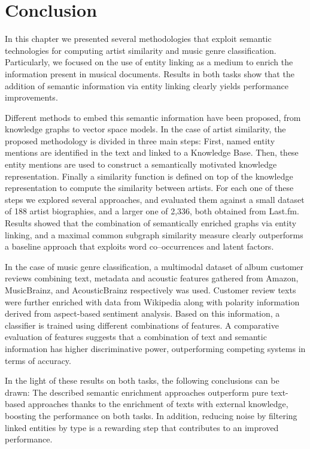 \section{Conclusion}
\label{sec:similarity:conclusion}

In this chapter we presented several methodologies that exploit semantic technologies for computing artist similarity and music genre classification. Particularly, we focused on the use of entity linking as a medium to enrich the information present in musical documents. Results in both tasks show that the addition of semantic information via entity linking clearly yields performance improvements.

Different methods to embed this semantic information have been proposed, from knowledge graphs to vector space models.
In the case of artist similarity, the proposed methodology is divided in three main steps: First, named entity mentions are identified in the text and linked to a Knowledge Base. Then, these entity mentions are used to construct a semantically motivated knowledge representation. Finally a similarity function is defined on top of the knowledge representation to compute the similarity between artists.
For each one of these steps we explored several approaches, and evaluated them against a small dataset of 188 artist biographies, and a larger one of 2,336, both obtained from Last.fm.
Results showed that the combination of semantically enriched graphs via entity linking, and a maximal common subgraph similarity measure clearly outperforms a baseline approach that exploits word co--occurrences and latent factors.

In the case of music genre classification, a multimodal dataset of album customer reviews combining text, metadata and acoustic features gathered from Amazon, MusicBrainz, and AcousticBrainz respectively was used. Customer review texts were further enriched with data from Wikipedia along with polarity information derived from aspect-based sentiment analysis. Based on this information, a classifier is trained using different combinations of features. 
A comparative evaluation of features suggests that a combination of text and semantic information has higher discriminative power, outperforming competing systems in terms of accuracy.

In the light of these results on both tasks, the following conclusions can be drawn: The described semantic enrichment approaches outperform pure text-based approaches thanks to the enrichment of texts with external knowledge, boosting the performance on both tasks. In addition, reducing noise by filtering linked entities by type is a rewarding step that contributes to an improved performance.
